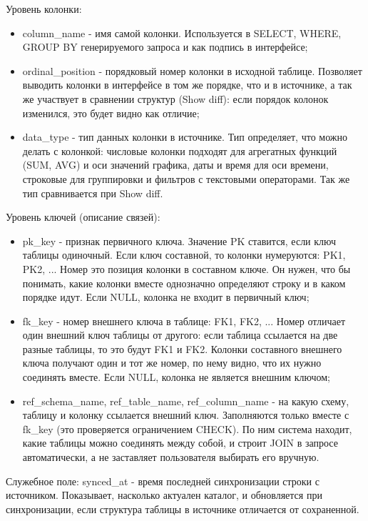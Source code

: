 \documentclass[areasetadvanced]{scrartcl}
\begin{document}
Уровень колонки:
\begin{itemize}
    \item column\_name - имя самой колонки. Используется в SELECT, WHERE, GROUP BY генерируемого запроса и как подпись в интерфейсе;
    \item ordinal\_position - порядковый номер колонки в исходной таблице. Позволяет выводить колонки в интерфейсе в том же порядке, что и в источнике, 
    а так же участвует в сравнении структур (Show diff): если порядок колонок изменился, это будет видно как отличие;
    \item data\_type - тип данных колонки в источнике. Тип определяет, что можно делать с колонкой: числовые колонки подходят для агрегатных функций (SUM, AVG) и оси значений графика, 
    даты и время для оси времени, строковые для группировки и фильтров с текстовыми операторами. Так же тип сравнивается при Show diff.
\end{itemize}

Уровень ключей (описание связей):
\begin{itemize}
    \item pk\_key - признак первичного ключа. Значение PK ставится, если ключ таблицы одиночный. Если ключ составной, то колонки нумеруются: PK1, PK2, ... 
    Номер это позиция колонки в составном ключе. Он нужен, что бы понимать, какие колонки вместе однозначно определяют строку и в каком порядке идут. 
    Если NULL, колонка не входит в первичный ключ;
    \item fk\_key - номер внешнего ключа в таблице: FK1, FK2, ... Номер отличает один внешний ключ таблицы от другого: если таблица ссылается на две разные таблицы, 
    то это будут FK1 и FK2. Колонки составного внешнего ключа получают один и тот же номер, по нему видно, что их нужно соединять вместе. 
    Если NULL, колонка не является внешним ключом;
    \item ref\_schema\_name, ref\_table\_name, ref\_column\_name - на какую схему, таблицу и колонку ссылается внешний ключ. Заполняются только вместе с fk\_key (это проверяется ограничением CHECK). 
    По ним система находит, какие таблицы можно соединять между собой, и строит JOIN в запросе автоматически, а не заставляет пользователя выбирать его вручную.
\end{itemize}

Служебное поле: synced\_at - время последней синхронизации строки с источником. Показывает, насколько актуален каталог, 
и обновляется при синхронизации, если структура таблицы в источнике отличается от сохраненной.
\end{document}
